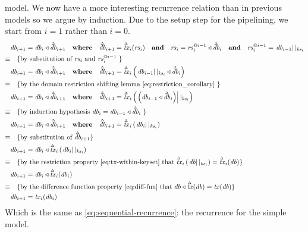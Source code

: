 \documentclass[11pt,a4paper]{article}
\newcommand\restrict[2]{\left.#1\right||_{#2}}
\newcommand\deltavar[1]{\accentset{\Delta}{#1}}
\begin{document}
model. We now have a more interesting recurrence relation than in previous
models so we argue by induction. Due to the setup step for the pipelining, we
start from $i=1$ rather than $i=0$.
\begin{align*}
       & \mathit{db}_{i+1} = \mathit{db}_i \triangleleft \deltavar{\mathit{db}}_{i+1}
         \quad \mathbf{where} \quad \deltavar{\mathit{db}}_{i+1} = \deltavar{\mathit{tx}}_i(\mathit{rs}_i)
         \quad \mathbf{and} \quad \mathit{rs}_i = \mathit{rs}^{@{i-1}}_i \triangleleft \deltavar{\mathit{db}}_i
         \quad \mathbf{and} \quad \mathit{rs}^{@i-1}_i = \restrict{\mathit{db}_{i-1}}{\mathit{ks}_i}
      \\
\equiv & \quad \text{\{by substitution of $\mathit{rs}_i$ and $\mathit{rs}^{@i-1}_i$ \}}
      \\
       & \mathit{db}_{i+1} = \mathit{db}_i \triangleleft \deltavar{\mathit{db}}_{i+1}
         \quad \mathbf{where} \quad \deltavar{\mathit{db}}_{i+1} = \deltavar{\mathit{tx}}_i\left(\restrict{\mathit{db}_{i-1}}{\mathit{ks}_i} \triangleleft \deltavar{\mathit{db}}_{i}\right)
      \\
\equiv & \quad \text{\{by the domain restriction shifting lemma \cref{eq:restriction_corollary} \}}
      \\
       & \mathit{db}_{i+1} = \mathit{db}_i \triangleleft \deltavar{\mathit{db}}_{i+1}
         \quad \mathbf{where} \quad \deltavar{\mathit{db}}_{i+1} = \deltavar{\mathit{tx}}_i\left(\restrict{\left(\mathit{db}_{i-1} \triangleleft \deltavar{\mathit{db}}_{i}\right)}{\mathit{ks}_i}\right)
      \\
\equiv & \quad \text{\{by induction hypothesis $\mathit{db}_i = \mathit{db}_{i-1} \triangleleft \deltavar{\mathit{db}}_{i}$ \}}
      \\
       & \mathit{db}_{i+1} = \mathit{db}_i \triangleleft \deltavar{\mathit{db}}_{i+1}
         \quad \mathbf{where} \quad \deltavar{\mathit{db}}_{i+1} = \deltavar{\mathit{tx}}_i\left(\restrict{\mathit{db}_i}{\mathit{ks}_i}\right)
      \\
\equiv & \quad \text{\{by substitution of $\deltavar{\mathit{db}}_{i+1}$\}}
      \\
       & \mathit{db}_{i+1} = \mathit{db}_i \triangleleft \deltavar{\mathit{tx}}_i\left(\restrict{\mathit{db}_i}{\mathit{ks}_i}\right)
      \\
\equiv & \quad \text{\{by the restriction property \cref{eq:tx-within-keyset} that
                     $\deltavar{\mathit{tx}}_i\left(\restrict{\mathit{db}}{\mathit{ks}_i}\right) = \deltavar{\mathit{tx}}_i(\mathit{db})$\}}
      \\
       & \mathit{db}_{i+1} = \mathit{db}_i \triangleleft \deltavar{\mathit{tx}}_i(\mathit{db}_i)
      \\
\equiv & \quad \text{\{by the difference function property \cref{eq:diff-fun} that
                     $db \triangleleft \deltavar{\mathit{tx}}(\mathit{db}) = \mathit{tx}(\mathit{db})$\}}
      \\
       & \mathit{db}_{i+1} = \mathit{tx}_i(\mathit{db}_i)
\end{align*}
Which is the same as \cref{eq:sequential-recurrence}: the recurrence for the simple model.
\end{document}

